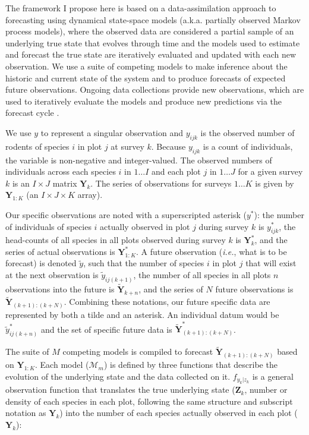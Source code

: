 \documentclass{article}
\begin{document}
The framework I propose here is based on a data-assimilation approach to forecasting using dynamical state-space models (a.k.a. partially observed Markov process models), where the observed data are considered a partial sample of an underlying true state that evolves through time \citep{Ionides2006, King2016} and the models used to estimate and forecast the true state are iteratively evaluated and updated with each new observation. We use a suite of competing models to make inference about the historic and current state of the system and to produce forecasts of expected future observations. Ongoing data collections provide new observations, which are used to iteratively evaluate the models and produce new predictions via the forecast cycle \citep{Dietze2017}. 

We use $y$ to represent a singular observation and $y_{ijk}$ is the observed number of rodents of species $i$ in plot $j$ at survey $k$. Because $y_{ijk}$ is a count of individuals, the variable is non-negative and integer-valued. The observed numbers of individuals across each species $i$ in $1 \ldots I$ and each plot $j$ in $1 \ldots J$ for a given survey $k$ is an $I \times J$ matrix $\textbf{Y}_k$. The series of observations for surveys $1 \ldots K$ is given by $\textbf{Y}_{1:K}$ (an $I \times J \times K$ array). 

Our specific observations are noted with a superscripted asterisk ($y^{*}$): the number of individuals of species $i$ actually observed in plot $j$ during survey $k$ is $y^{*}_{ijk}$, the head-counts of all species in all plots observed during survey $k$ is $\textbf{Y}^{*}_{k}$, and the series of actual observations is $\textbf{Y}^{*}_{1:K}$. A future observation (\emph{i.e.}, what is to be forecast) is denoted $\tilde{y}$, such that the number of species $i$ in plot $j$ that will exist at the next observation is $\tilde{y}_{ij(k+1)}$, the number of all species in all plots $n$ observations into the future is $\tilde{\textbf{Y}}_{k+n}$, and the series of $N$ future observations is $\tilde{\textbf{Y}}_{(k+1):(k+N)}$. Combining these notations, our future specific data are represented by both a tilde and an asterisk. An individual datum would be $\tilde{y}^{*}_{ij(k+n)}$ and the set of specific future data is $\tilde{\textbf{Y}}^{*}_{(k+1):(k+N)}$.

The suite of $M$ competing models is compiled to forecast $\tilde{\textbf{Y}}_{(k+1):(k+N)}$ based on $\textbf{Y}_{1:K}$. Each model ($\mathcal{M}_m$) is defined by three functions that describe the evolution of the underlying state and the data collected on it. $f_{y_k|z_k}$ is a general observation function that translates the true underlying state ($\textbf{Z}_k$, number or density of each species in each plot, following the same structure and subscript notation as $\textbf{Y}_k$) into the number of each species actually observed in each plot ($\textbf{Y}_k$):
\end{document}
